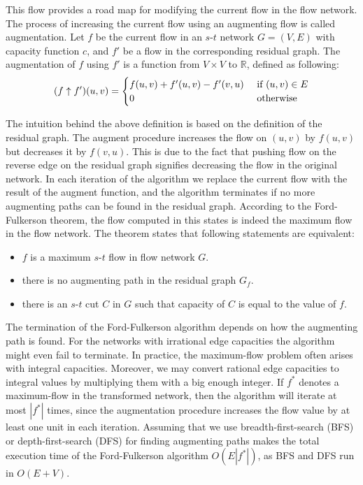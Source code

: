 \documentclass{llncs}
\begin{document}
This flow provides a road map for modifying the current flow in the flow network. The process of increasing the current flow using an augmenting flow is called augmentation. Let $f$ be the current flow in an $s$-$t$ network $G = (V, E)$ with capacity function $c$, and $f'$ be a flow in the corresponding residual graph. The augmentation of $f$ using $f'$ is a function from $V \times V$ to $\mathbb{R}$, defined as following:
\[ (f \uparrow f') (u, v) = 
	\begin{cases}
	f (u, v) + f'(u, v) - f'(v, u) \hfill & \text{ if $(u, v) \in E$} \\	
	0 \hfill & \text{ otherwise} \\
	\end{cases} 
\]

The intuition behind the above definition is based on the definition of the residual graph. The augment procedure increases the flow on $(u, v)$ by $f ( u, v )$ but decreases it by $f (v, u)$. This is due to the fact that pushing flow on the reverse edge on the residual graph signifies decreasing the flow in the original network. In each iteration of the algorithm we replace the current flow with the result of the augment function, and the algorithm terminates if no more augmenting paths can be found in the residual graph. According to the Ford-Fulkerson theorem, the flow computed in this states is indeed the maximum flow in the flow network. The theorem states that following statements are equivalent:

\begin{itemize}
\item $f$ is a maximum $s$-$t$ flow in flow network $G$.
\item there is no augmenting path in the residual graph $G_f$.
\item there is an $s$-$t$ cut $C$ in $G$ such that capacity of $C$ is equal to the value of $f$.
\end{itemize}

The termination of the Ford-Fulkerson algorithm depends on how the augmenting path is found. For the networks with irrational edge capacities the algorithm might even fail to terminate. In practice, the maximum-flow problem often arises with integral capacities. Moreover, we may convert rational edge capacities to integral values by multiplying them with a big enough integer. If $f^*$ denotes a maximum-flow in the transformed network, then the algorithm will iterate at most $|f^*|$ times, since the augmentation procedure increases the flow value by at least one unit in each iteration. Assuming that we use breadth-first-search (BFS) or depth-first-search (DFS) for finding augmenting paths makes the total execution time of the Ford-Fulkerson algorithm $O ( E | f^* |)$, as BFS and DFS run in $O (E + V)$.
\end{document}
